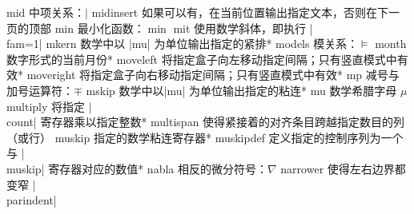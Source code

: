 \capcs mid {中项关系：$\mid$}{}{}
\capcs midinsert {如果可以有，在当前位置输出指定文本，否则在下一页的顶部}{}{}
\capcs min {最小化函数：$\min$}{}{}
\capcs mit {使用数学斜体，即执行 |\\fam=1|}{}{}
\capcs mkern {数学中以 |mu| 为单位输出指定的紧排}*{}
\capcs models {模关系：$\models$}{}{}
\capcs month {数字形式的当前月份}*{}
\capcs moveleft {将指定盒子向左移动指定间隔；只有竖直模式中有效}*{}
\capcs moveright {将指定盒子向右移动指定间隔；只有竖直模式中有效}*{}
\capcs mp {减号与加号运算符：$\mp$}{}{}
\capcs mskip {数学中以|mu| 为单位输出指定的粘连}*{}
\capcs mu {数学希腊字母 $\mu$}{}{}
\capcs multiply {将指定 |\\count| 寄存器乘以指定整数}*{}
\capcs multispan {使得紧接着的对齐条目跨越指定数目的列（或行）}{}{}
\capcs muskip {指定的数学粘连寄存器}*{}
\capcs muskipdef {定义指定的控制序列为一个与 |\\muskip| 寄存器对应的数值}*{}
\capcs nabla {相反的微分符号：$\nabla$}{}{}
\capcs narrower {使得左右边界都变窄 |\\parindent|}{}{}
